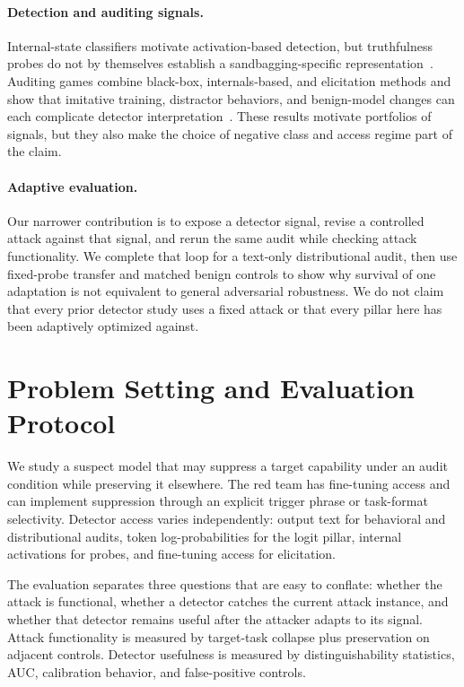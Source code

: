 \documentclass{article}
\begin{document}
\paragraph{Detection and auditing signals.}
Internal-state classifiers motivate activation-based detection, but truthfulness probes do not by themselves establish a sandbagging-specific representation~\citep{AzariaMitchell2023}. Auditing games combine black-box, internals-based, and elicitation methods and show that imitative training, distractor behaviors, and benign-model changes can each complicate detector interpretation~\citep{TaylorBlack2025}. These results motivate portfolios of signals, but they also make the choice of negative class and access regime part of the claim.

\paragraph{Adaptive evaluation.}
Our narrower contribution is to expose a detector signal, revise a controlled attack against that signal, and rerun the same audit while checking attack functionality. We complete that loop for a text-only distributional audit, then use fixed-probe transfer and matched benign controls to show why survival of one adaptation is not equivalent to general adversarial robustness. We do not claim that every prior detector study uses a fixed attack or that every pillar here has been adaptively optimized against.

\section{Problem Setting and Evaluation Protocol}
\label{sec:problem}

We study a suspect model that may suppress a target capability under an audit condition while preserving it elsewhere. The red team has fine-tuning access and can implement suppression through an explicit trigger phrase or task-format selectivity. Detector access varies independently: output text for behavioral and distributional audits, token log-probabilities for the logit pillar, internal activations for probes, and fine-tuning access for elicitation.

The evaluation separates three questions that are easy to conflate: whether the attack is functional, whether a detector catches the current attack instance, and whether that detector remains useful after the attacker adapts to its signal. Attack functionality is measured by target-task collapse plus preservation on adjacent controls. Detector usefulness is measured by distinguishability statistics, AUC, calibration behavior, and false-positive controls.
\end{document}
